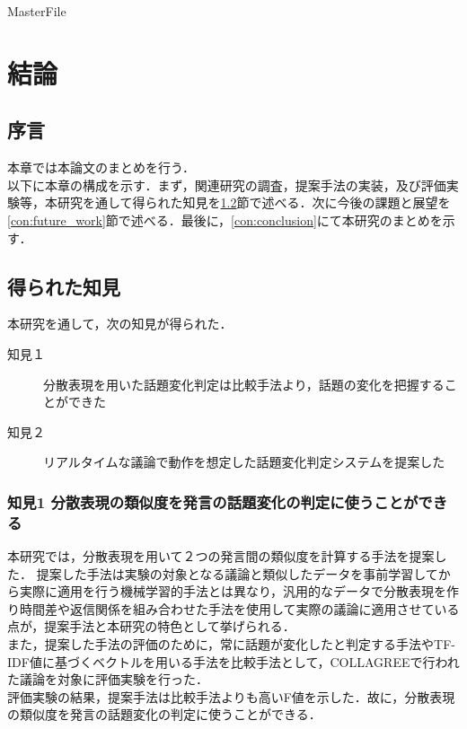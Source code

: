 \expandafter\ifx\csname MasterFile\endcsname\relax
\def\SubFile{hoge}


\setcounter{chapter}{5}
\fi
\cleardoublepage
\chapter{結論}
\label{con:chapter}

\section{序言}
\label{con:introduction}
本章では本論文のまとめを行う．\\
以下に本章の構成を示す．まず，関連研究の調査，提案手法の実装，及び評価実験等，本研究を通して得られた知見を\ref{con:knowledge}節で述べる．次に今後の課題と展望を\ref{con:future_work}節で述べる．最後に，\ref{con:conclusion}にて本研究のまとめを示す．

\section{得られた知見}
\label{con:knowledge}
本研究を通して，次の知見が得られた．
\begin{description}
  \item[知見１] 分散表現を用いた話題変化判定は比較手法より，話題の変化を把握することができた
  \item[知見２] リアルタイムな議論で動作を想定した話題変化判定システムを提案した
\end{description}

\subsection*{知見1 分散表現の類似度を発言の話題変化の判定に使うことができる}
本研究では，分散表現を用いて２つの発言間の類似度を計算する手法を提案した．
提案した手法は実験の対象となる議論と類似したデータを事前学習してから実際に適用を行う機械学習的手法とは異なり，汎用的なデータで分散表現を作り時間差や返信関係を組み合わせた手法を使用して実際の議論に適用させている点が，提案手法と本研究の特色として挙げられる．\\
また，提案した手法の評価のために，常に話題が変化したと判定する手法やTF-IDF値に基づくベクトルを用いる手法を比較手法として，COLLAGREEで行われた議論を対象に評価実験を行った．\\
評価実験の結果，提案手法は比較手法よりも高いF値を示した．故に，分散表現の類似度を発言の話題変化の判定に使うことができる．

